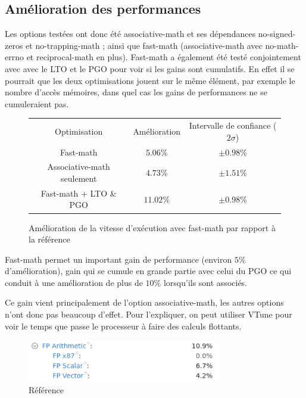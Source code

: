 \documentclass[a4paper,11pt]{report}
\begin{document}
\subsection{Amélioration des performances}
Les options testées ont donc été associative-math et ses dépendances no-signed-zeros et no-trapping-math ;
ainsi que fast-math (associative-math avec no-math-errno et reciprocal-math en plus).
Fast-math a également été testé conjointement avec avec le LTO et le PGO pour voir si les gains sont cumulatifs.
En effet il se pourrait que les deux optimisations jouent sur le même élément, par exemple le nombre d'accès mémoires, dans quel cas les gains de performances ne se cumuleraient pas.
\begin{figure}[H]
    \begin{center}
        \begin{tabular}{ c c c }
            Optimisation               & Amélioration & Intervalle de confiance ($2\sigma$) \\
            Fast-math                  & $5.06\%$     & $\pm 0.98\%$                        \\
            Associative-math seulement & $4.73\%$     & $\pm 1.51\%$                        \\
            Fast-math + LTO \& PGO     & $11.02\%$    & $\pm 0.98\%$
        \end{tabular}
    \end{center}
    \caption{Amélioration de la vitesse d'exécution avec fast-math par rapport à la référence}
    \label{results_fast-math}
\end{figure}

Fast-math permet un important gain de performance (environ $5\%$ d'amélioration),
gain qui se cumule en grande partie avec celui du PGO ce qui conduit à une amélioration de plus de $10\%$ lorsqu'ils sont associés.

Ce gain vient principalement de l'option associative-math, les autres options n'ont donc pas beaucoup d'effet.
Pour l'expliquer, on peut utiliser VTune pour voir le temps que passe le processeur à faire des calculs flottants.

\begin{figure}[H]
    \includegraphics[width=0.75\textwidth, center]{reference_vtune.png}
    \caption{Référence}
    \label{reference_vtune}
\end{figure}
\end{document}
